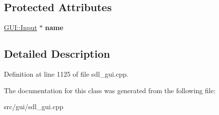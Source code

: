 \subsection*{Protected Attributes}
\begin{DoxyCompactItemize}
\item 
\hypertarget{classSetLocalSize_a04b30f6369fc83b25a0047080f78fa2c}{\hyperlink{classGUI_1_1Input}{G\-U\-I\-::\-Input} $\ast$ {\bfseries name}}\label{classSetLocalSize_a04b30f6369fc83b25a0047080f78fa2c}

\end{DoxyCompactItemize}


\subsection{Detailed Description}


Definition at line 1125 of file sdl\-\_\-gui.\-cpp.



The documentation for this class was generated from the following file\-:\begin{DoxyCompactItemize}
\item 
src/gui/sdl\-\_\-gui.\-cpp\end{DoxyCompactItemize}
